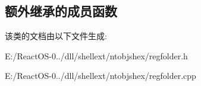 \subsection*{额外继承的成员函数}


该类的文档由以下文件生成\+:\begin{DoxyCompactItemize}
\item 
E\+:/\+React\+O\+S-\/0../dll/shellext/ntobjshex/regfolder.\+h\item 
E\+:/\+React\+O\+S-\/0../dll/shellext/ntobjshex/regfolder.\+cpp\end{DoxyCompactItemize}
